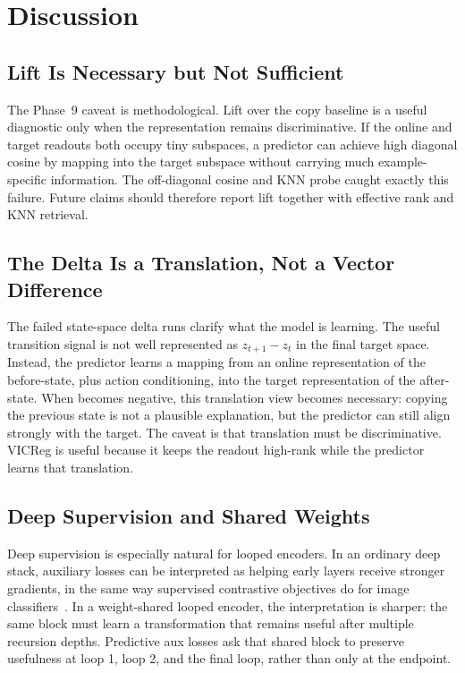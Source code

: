 \section{Discussion}
\label{sec:discussion}

\subsection{Lift Is Necessary but Not Sufficient}

The Phase~9 caveat is methodological.  Lift over the copy baseline is a
useful diagnostic only when the representation remains discriminative.
If the online and target readouts both occupy tiny subspaces, a predictor
can achieve high diagonal cosine by mapping into the target subspace
without carrying much example-specific information.  The off-diagonal
cosine and KNN probe caught exactly this failure.  Future \CodeWM{}
claims should therefore report lift together with effective rank and KNN
retrieval.

\subsection{The Delta Is a Translation, Not a Vector Difference}

The failed state-space delta runs clarify what the model is learning.
The useful transition signal is not well represented as
$z_{t+1}-z_t$ in the final target space.  Instead, the predictor learns a
mapping from an online representation of the before-state, plus action
conditioning, into the target representation of the after-state.  When
\copycos{} becomes negative, this translation view becomes necessary:
copying the previous state is not a plausible explanation, but the
predictor can still align strongly with the target.  The caveat is that
translation must be discriminative.  VICReg is useful because it keeps
the readout high-rank while the predictor learns that translation.

\subsection{Deep Supervision and Shared Weights}

Deep supervision is especially natural for looped encoders.  In an
ordinary deep stack, auxiliary losses can be interpreted as helping early
layers receive stronger gradients, in the same way supervised contrastive
objectives do for image classifiers~\citep{khosla2020supcon}.  In a
weight-shared looped encoder, the interpretation is sharper: the same
block must learn a transformation that remains useful after multiple
recursion depths.  Predictive aux losses ask that shared block to
preserve usefulness at loop 1, loop 2, and the final loop, rather than
only at the endpoint.

